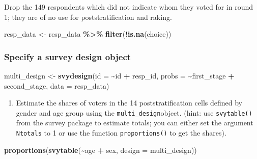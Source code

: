 \documentclass[
]{article}
\newenvironment{Shaded}{\begin{snugshade}}{\end{snugshade}}
\newcommand{\AttributeTok}[1]{\textcolor[rgb]{0.13,0.29,0.53}{#1}}
\newcommand{\FunctionTok}[1]{\textcolor[rgb]{0.13,0.29,0.53}{\textbf{#1}}}
\newcommand{\NormalTok}[1]{#1}
\newcommand{\OtherTok}[1]{\textcolor[rgb]{0.56,0.35,0.01}{#1}}
\newcommand{\SpecialCharTok}[1]{\textcolor[rgb]{0.81,0.36,0.00}{\textbf{#1}}}
\providecommand{\tightlist}{%
  \setlength{\itemsep}{0pt}\setlength{\parskip}{0pt}}
\begin{document}
Drop the 149 respondents which did not indicate whom they voted for in
round 1; they are of no use for poststratification and raking.

\begin{Shaded}
\begin{Highlighting}[]
\NormalTok{resp\_data }\OtherTok{\textless{}{-}}\NormalTok{ resp\_data }\SpecialCharTok{\%\textgreater{}\%}
  \FunctionTok{filter}\NormalTok{(}\SpecialCharTok{!}\FunctionTok{is.na}\NormalTok{(choice))}
\end{Highlighting}
\end{Shaded}

\subsubsection{Specify a survey design
object}\label{specify-a-survey-design-object}

\begin{Shaded}
\begin{Highlighting}[]
\NormalTok{multi\_design }\OtherTok{\textless{}{-}} \FunctionTok{svydesign}\NormalTok{(}\AttributeTok{id =} \SpecialCharTok{\textasciitilde{}}\NormalTok{id }\SpecialCharTok{+}\NormalTok{ resp\_id, }\AttributeTok{probs =} \SpecialCharTok{\textasciitilde{}}\NormalTok{first\_stage }\SpecialCharTok{+}\NormalTok{ second\_stage, }\AttributeTok{data =}\NormalTok{ resp\_data)}
\end{Highlighting}
\end{Shaded}

\begin{enumerate}
\def\labelenumi{\arabic{enumi}.}
\tightlist
\item
  Estimate the shares of voters in the 14 poststratification cells
  defined by gender and age group using the
  \texttt{multi\_design}object. (hint: use \texttt{svytable()} from the
  survey package to estimate totals; you can either set the argument
  \texttt{Ntotals} to 1 or use the function \texttt{proportions()} to
  get the shares).
\end{enumerate}

\begin{Shaded}
\begin{Highlighting}[]
\FunctionTok{proportions}\NormalTok{(}\FunctionTok{svytable}\NormalTok{(}\SpecialCharTok{\textasciitilde{}}\NormalTok{age }\SpecialCharTok{+}\NormalTok{ sex, }\AttributeTok{design =}\NormalTok{ multi\_design))}
\end{Highlighting}
\end{Shaded}
\end{document}
